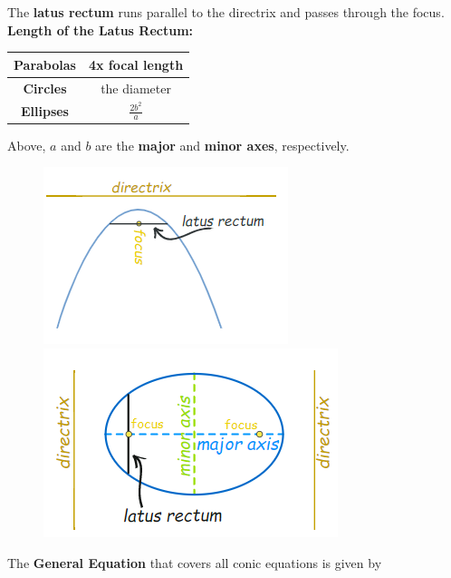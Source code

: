 \documentclass{article}
\begin{document}
    \noindent The \textbf{latus rectum} runs parallel to the directrix and passes through the focus. \\
    \noindent \textbf{Length of the Latus Rectum:} \\

    \begin{center}
        \begin{tabular}{|c|c|}
            \hline
            \textbf{Parabolas} & 4x focal length  \\
            \hline
            \textbf{Circles}   & the diameter     \\
            \hline
            \textbf{Ellipses}  & $\frac{2b^2}{a}$ \\
            \hline
        \end{tabular}
    \end{center}

    \noindent Above, $a$ and $b$ are the \textbf{major} and \textbf{minor axes}, respectively.

    \begin{figure} [hbt!]
        \centering
        \includegraphics[scale = 0.6] {Resources/Unit10Conics/latrect.PNG}
        \includegraphics[scale = 0.6] {Resources/Unit10Conics/lactrect2.PNG}
    \end{figure}

    \noindent The \textbf{General Equation} that covers all conic equations is given by \\
\end{document}
